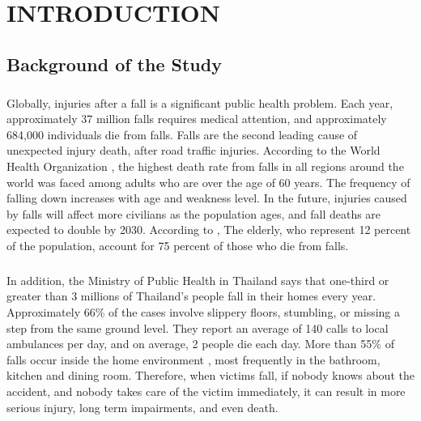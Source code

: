 \setlength{\parindent}{0in} 
\setlength{\parskip}{1em}
\setlength{\baselineskip}{1.6em}
\setlength{\parindent}{0em}              

\chapter{INTRODUCTION} 

\section{Background of the Study}
\paragraph{}
Globally, injuries after a fall is a significant public health problem. Each year, approximately 37 million falls requires medical attention, and approximately 684,000 individuals die from falls. Falls are the second leading cause of unexpected injury death, after road traffic injuries. According to the World Health Organization \cite{world_health_organization_2018}, the highest death rate from falls in all regions around the world was faced among adults who are over the age of 60 years. The frequency of falling down increases with age and weakness level. In the future, injuries caused by falls will affect more civilians as the population ages, and fall deaths are expected to double by 2030. According to \citeauthor{fuller_2013} \citeyear{fuller_2013}, The elderly, who represent 12 percent of the population, account for 75 percent of those who die from falls. 
 
 \paragraph{}
In addition, the Ministry of Public Health in Thailand \cite{thaincd.com_2019} says that one-third or greater than 3 millions of Thailand’s people fall in their homes every year. Approximately 66\% of the cases involve slippery floors, stumbling, or missing a step from the same ground level. They report an average of 140 calls to local ambulances per day, and on average, 2 people die each day. More than 55\% of falls occur inside the home environment \cite{pynoos_steinman_nguyen_2010}, most frequently in the bathroom, kitchen and dining room. Therefore, when victims fall, if nobody knows about the accident, and nobody takes care of the victim immediately, it can result in more serious injury, long term impairments, and even death.

